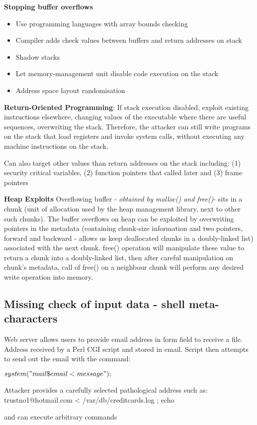 \documentclass{article}
\newenvironment{example}{\par\color{brown}}{\par}
\begin{document}
\textbf{Stopping buffer overflows}
\begin{itemize}
	\item Use programming languages with array bounds checking
	\item Compiler adds check values between buffers and return addresses on stack
	\item Shadow stacks
	\item Let memory-management unit disable code execution on the stack
	\item Address space layout randomisation
\end{itemize}

\textbf{Return-Oriented Programming}: If stack execution disabled, exploit existing instructions elsewhere, changing values of the executable where there are useful sequences, overwriting the stack. Therefore, the attacker can still write programs on the stack that load registers and invoke system calls, without executing any machine instructions on the stack.

\bigskip
Can also target other values than return addresses on the stack including: (1) security critical variables, (2) function pointers that called later and (3) frame pointers

\bigskip
\textbf{Heap Exploits}
Overflowing buffer - \textit{obtained by malloc() and free()}- sits in a chunk (unit of allocation used by the heap management library, next to other such chunks). The buffer overflows on heap can be exploited by overwriting pointers in the metadata (containing chunk-size information and two pointers, forward and backward - allows us keep deallocated chunks in a doubly-linked list) associated with the next chunk. free() operation will manipulate these value to return a chunk into a doubly-linked list, then after careful manipulation on chunk's metadata, call of free() on a neighbour chunk will perform any desired write operation into memory.


\subsection{Missing check of input data - shell meta-characters}
\begin{example}
Web server allows users to provide email address in form field to receive a file. Address received by a Perl CGI script and stored in \textdollar email. Script then attempts to send out the email with the command:

$system("mail  \text{\textdollar}email <message");$

Attacker provides a carefully selected pathological address such as: trustno1@hotmail.com < /var/db/creditcards.log ; echo

and can execute arbitrary commands
\end{example}
\end{document}

